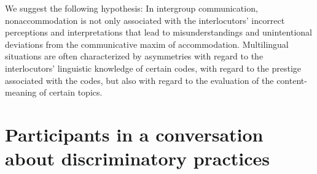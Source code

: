 \documentclass[output=paper,colorlinks,citecolor=brown]{langscibook}
\begin{document}
\begin{sloppypar}
We suggest the following hypothesis: In intergroup communication, nonaccommodation is not only associated with the interlocutors' incorrect perceptions and interpretations that lead to misunderstandings and unintentional deviations from the communicative maxim of accommodation. Multilingual situations are often characterized by asymmetries with regard to the interlocutors' linguistic knowledge of certain codes, with regard to the prestige associated with the codes, but also with regard to the evaluation of the content-meaning of certain topics.
\end{sloppypar}

\section{Participants in a conversation about discriminatory practices}\label{CH1.1.ss.2}
\end{document}
